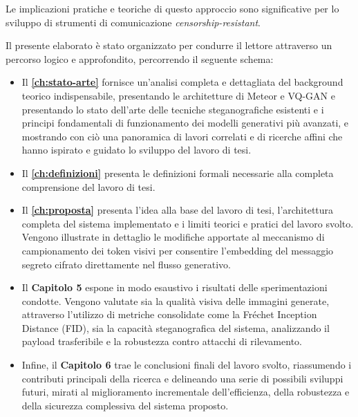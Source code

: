 Le implicazioni pratiche e teoriche di questo approccio sono significative per lo sviluppo di strumenti di comunicazione \emph{censorship-resistant}.

\bigskip

Il presente elaborato è stato organizzato per condurre il lettore attraverso un percorso logico e approfondito, percorrendo il seguente schema:

\begin{itemize}
	\item Il \textbf{\autoref{ch:stato-arte}} fornisce un'analisi completa e dettagliata del background teorico indispensabile, presentando le architetture di Meteor e VQ-GAN e presentando lo stato dell'arte delle tecniche steganografiche esistenti e i principi fondamentali di funzionamento dei modelli generativi più avanzati, e mostrando con ciò una panoramica di lavori correlati e di ricerche affini che hanno ispirato e guidato lo sviluppo del lavoro di tesi.
	\item Il \textbf{\autoref{ch:definizioni}} presenta le definizioni formali necessarie alla completa comprensione del lavoro di tesi.
	
	\item Il \textbf{\autoref{ch:proposta}} presenta l'idea alla base del lavoro di tesi, l'architettura completa del sistema implementato e i limiti teorici e pratici del lavoro svolto. Vengono illustrate in dettaglio le modifiche apportate al meccanismo di campionamento dei token visivi per consentire l'embedding del messaggio segreto cifrato direttamente nel flusso generativo.
	
	\item Il \textbf{Capitolo 5} espone in modo esaustivo i risultati delle sperimentazioni condotte. Vengono valutate sia la qualità visiva delle immagini generate, attraverso l'utilizzo di metriche consolidate come la Fréchet Inception Distance (FID), sia la capacità steganografica del sistema, analizzando il payload trasferibile e la robustezza contro attacchi di rilevamento.
	
	\item Infine, il \textbf{Capitolo 6} trae le conclusioni finali del lavoro svolto, riassumendo i contributi principali della ricerca e delineando una serie di possibili sviluppi futuri, mirati al miglioramento incrementale dell'efficienza, della robustezza e della sicurezza complessiva del sistema proposto.
\end{itemize}